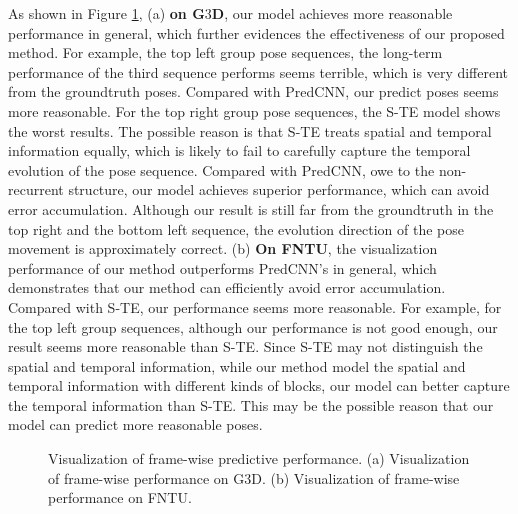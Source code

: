 \documentclass[journal]{IEEEtran}
\begin{document}
As shown in Figure \ref{fig14}, (a) {\bf on G${3}$D}, our model achieves more reasonable performance in general, which further evidences the effectiveness of our proposed method. For example, the top left group pose sequences, the long-term performance of the third sequence performs seems terrible, which is very different from the groundtruth poses. Compared with PredCNN, our predict poses seems more reasonable. For the top right group pose sequences, the S-TE model shows the worst results. The possible reason is that S-TE treats spatial and temporal information equally, which is likely to fail to carefully capture the temporal evolution of the pose sequence. Compared with PredCNN, owe to the non-recurrent structure, our model achieves superior performance, which can avoid error accumulation. Although our result is still far from the groundtruth in the top right and the bottom left sequence, the evolution direction of the pose movement is approximately correct. (b) {\bf On FNTU}, the visualization performance of our method outperforms PredCNN's in general, which demonstrates that our method can efficiently avoid error accumulation. Compared with S-TE, our performance seems more reasonable. For example, for the top left group sequences, although our performance is not good enough, our result seems more reasonable than S-TE. Since S-TE may not distinguish the spatial and temporal information, while our method model the spatial and temporal information with different kinds of blocks, our model can better capture the temporal information than S-TE. This may be the possible reason that our model can predict more reasonable poses.


\begin{figure}[!t]
\centering
{}
\hfil
{}
\caption{ Visualization of frame-wise predictive performance. (a) Visualization of frame-wise performance on G${3}$D. (b) Visualization of frame-wise performance on FNTU. }
\label{fig14}
\end{figure}
\end{document}
